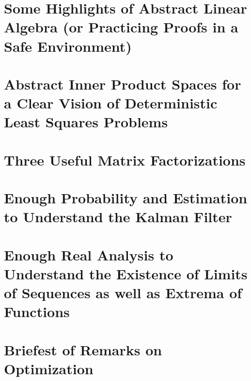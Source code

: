 \documentclass[letterpaper]{book}
\begin{document}
\chapter{Some Highlights of Abstract Linear Algebra (or Practicing Proofs in a Safe Environment)}
\label{chap:LinearAlgebra}


\chapter{Abstract Inner Product Spaces for a Clear Vision of Deterministic Least Squares Problems}
\label{chap:IPSpacesandLeastSqaures}


\chapter{Three Useful Matrix Factorizations}
\label{chap:IPSpacesandLeastSqaures}


\chapter{Enough Probability and Estimation to Understand the Kalman Filter}
\label{chap:ProbEstim}


\chapter{Enough Real Analysis to Understand the Existence of Limits of Sequences as well as Extrema of Functions}
\label{chap:RealAnalysis}


\chapter{Briefest of Remarks on Optimization}
\label{chap:Optimization}


\pagestyle{plain}



\end{document}
